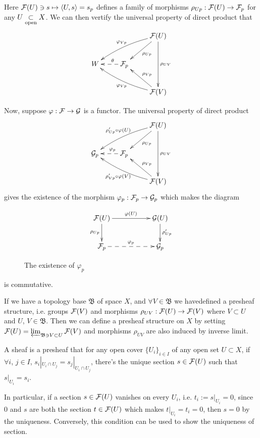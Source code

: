 \documentclass[10pt]{extbook}
\begin{document}
Here $\mathcal{F}(U)\ni s\mapsto \langle U,s\rangle=s_p$ defines a family of morphisms 
$\rho_{Up}:\mathcal{F}(U)\to \mathcal{F}_p$ for any $U\underset{\mathrm{open}}{\subset} X$. We can then vertify the 
universal property of direct product that
\[
	\xymatrix{
	&&\ar[dl]^{\rho_{Up}}\calf(U)\ar[dd]^{\rho_{UV}}\ar@/_/[lld]_{\varphi_{Vp}} \\
	W&\ar@{-->}[l]_(0.4){\theta}\calf_p&\\
	&&\ar[ul]_{\rho_{Vp}}\calf(V)\ar@/^/[llu]^{\varphi_{Vp}}
	}
\]

Now, suppose $\varphi:\mathcal{F} \to \mathcal{G}$ is a functor. The universal property of direct product 
\[
	\xymatrix{
		&&\ar[dl]^{\rho_{Up}}\calf(U)\ar[dd]^{\rho_{UV}}\ar@/_/[lld]_{\rho'_{Up}\circ\varphi(U)} \\
		\calg_p&\ar@{-->}[l]_(0.4){\varphi_p}\calf_p&\\
		&&\ar[ul]_{\rho_{Vp}}\calf(V)\ar@/^/[llu]^{\rho'_{Vp}\circ\varphi(V)}
	}
\]
gives the existence of the morphism $\varphi_p:\mathcal{F}_p\to \mathcal{G}_p$ which makes the diagram
\begin{figure}[h]
\[
	\xymatrix{
		\calf(U)\ar[rr]^{\varphi(U)} \ar[d]_{\rho_{Up}}&&\calg(U) \ar[d]^{\rho'_{Up}}\\
		\calf_p\ar@{-->}[rr]^{\varphi_p}&&\calg_p
	}
\]
\caption{The existence of $\varphi_p$}
\label{fig1}
\end{figure}

\noindent is commutative.

\para If we have a topology base $\mathfrak{B}$ of space $X$, and $\forall V\in \mathfrak{B}$ 
we havedefined a presheaf structure, i.e. groups $\mathcal{F}(V)$ and morphisms 
$\rho_{UV}:\mathcal{F}(U)\to \mathcal{F}(V)$ where $V\subset U$ and $U$, $V\in \mathfrak{B}$. Then we can 
define a presheaf structure on $X$ by setting
 $\mathcal{F}(U)=\varprojlim_{\mathfrak{B}\ni V \subset U} \mathcal{F}(V)$ and morphisms $\rho_{UV}$ are
also induced by inverse limit.

\para A sheaf is a presheaf that for any open cover $\{U_i\}_{i\in I}$ of any open set $U\subset X$, 
if $\forall i$, $j\in I$, $s_i|_{U_i\cap U_j}=s_j|_{U_i\cap U_j}$, there's the unique section 
$s\in\mathcal{F}(U)$ such that $s|_{U_i}=s_i$.

In particular, if a section $s\in \mathcal{F}(U)$ vanishes on every $U_i$, i.e. $t_i:=s|_{U_i}=0$, since 
$0$ and $s$ are both the section $t\in \mathcal{F}(U)$ which makes $t|_{U_i}=t_i=0$, then $s=0$ by the uniqueness. Conversely, this condition can be used to show the uniqueness of section.  

\end{document}
